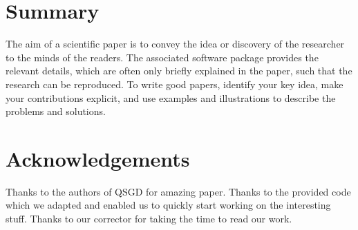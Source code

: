 \documentclass[10pt,conference,compsocconf]{IEEEtran}
\begin{document}
\section{Summary}

The aim of a scientific paper is to convey the idea or discovery of
the researcher to the minds of the readers. The associated software
package provides the relevant details, which are often only briefly
explained in the paper, such that the research can be reproduced.
To write good papers, identify your key idea, make your contributions
explicit, and use examples and illustrations to describe the problems
and solutions.

\section*{Acknowledgements}

Thanks to the authors of QSGD for amazing paper. Thanks to the provided code which we adapted and enabled us to quickly start working on the interesting stuff.
Thanks to our corrector for taking the time to read our work.


\newpage


\end{document}

